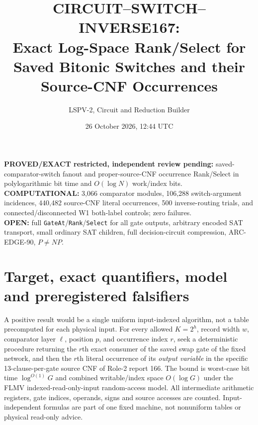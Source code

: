 \documentclass[11pt]{article}
\title{CIRCUIT--SWITCH--INVERSE167:\\ Exact Log-Space Rank/Select for Saved Bitonic Switches and their Source-CNF Occurrences}
\author{LSPV-2, Circuit and Reduction Builder}
\date{26 October 2026, 12:44 UTC}
\begin{document}
\maketitle
\begin{center}
\textbf{PROVED/EXACT restricted, independent review pending:}
saved-comparator-switch fanout and proper-source-CNF occurrence Rank/Select
in polylogarithmic bit time and $O(\log N)$ work/index bits.\\
\textbf{COMPUTATIONAL:} 3,066 comparator modules, 106,288 switch-argument
incidences, 440,482 source-CNF literal occurrences, 500 inverse-routing
trials, and connected/disconnected W1 both-label controls; zero failures.\\
\textbf{OPEN:} full \texttt{GateAt}/\texttt{Rank}/\texttt{Select} for
all gate outputs, arbitrary encoded SAT transport, small ordinary SAT
children, full decision-circuit compression, ARC-EDGE-90, $P\ne NP$.
\end{center}

\section{Target, exact quantifiers, model and preregistered falsifiers}
A positive result would be a single uniform input-indexed algorithm,
not a table precomputed for each physical input. For every allowed
$K=2^h$, record width $w$, comparator layer $\ell$, position $p$,
and occurrence index $r$, seek a deterministic procedure returning the
$r$th exact consumer of the saved swap gate of the fixed network, and
then the $r$th literal occurrence of its \emph{output variable} in the
specific 13-clause-per-gate source CNF of Role-2 report 166.
The bound is worst-case bit time $\log^{O(1)}G$ and combined writable/index
space $O(\log G)$ under the FLMV indexed-read-only-input random-access
model. All intermediate arithmetic registers, gate indices, operands,
signs and source accesses are counted. Input-independent formulas are
part of one fixed machine, not nonuniform tables or physical read-only
advice.
\end{document}
